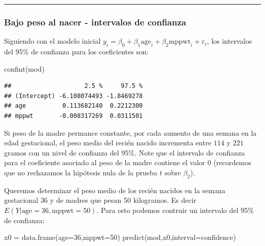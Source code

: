 \documentclass[
]{article}
\newenvironment{Shaded}{\begin{snugshade}}{\end{snugshade}}
\newcommand{\AttributeTok}[1]{\textcolor[rgb]{0.77,0.63,0.00}{#1}}
\newcommand{\DecValTok}[1]{\textcolor[rgb]{0.00,0.00,0.81}{#1}}
\newcommand{\FunctionTok}[1]{\textcolor[rgb]{0.00,0.00,0.00}{#1}}
\newcommand{\NormalTok}[1]{#1}
\newcommand{\OtherTok}[1]{\textcolor[rgb]{0.56,0.35,0.01}{#1}}
\newcommand{\StringTok}[1]{\textcolor[rgb]{0.31,0.60,0.02}{#1}}
\begin{document}
\rule{\textwidth}{0.4pt}

\hypertarget{bajo-peso-al-nacer---intervalos-de-confianza}{%
\subsubsection*{Bajo peso al nacer - intervalos de confianza}\label{bajo-peso-al-nacer---intervalos-de-confianza}}

Siguiendo con el modelo inicial \(y_{i}=\beta_{0}+\beta_{1}\mbox{age}_{i}+\beta_{2}\mbox{mppwt}_{i}+\varepsilon_{i}\), los intervalos del 95\% de confianza para los coeficientes son:

\begin{Shaded}
\begin{Highlighting}[]
\FunctionTok{confint}\NormalTok{(mod)}
\end{Highlighting}
\end{Shaded}

\begin{verbatim}
##                    2.5 %     97.5 %
## (Intercept) -6.108074493 -1.8469278
## age          0.113682140  0.2212300
## mppwt       -0.008317269  0.0311501
\end{verbatim}

Si peso de la madre permance constante, por cada aumento de una semana en la edad gestacional, el peso medio del recién nacido incrementa entre \(114\) y \(221\) gramos con un nivel de confianza del 95\%. Note que el intervalo de confianza para el coeficiente asociado al peso de la madre contiene el valor \(0\) (recordemos que no rechazamos la hipótesis nula de la prueba \(t\) sobre \(\beta_{2}\)).

Queremos determinar el peso medio de los recién nacidos en la semana gestacional \(36\) y de madres que pesan 50 kilogramos. Es decir \(E(Y|\mbox{age}=36, \mbox{mppwt}=50)\). Para esto podemos contruir un intervalo del 95\% de confianza:

\begin{Shaded}
\begin{Highlighting}[]
\NormalTok{x0 }\OtherTok{=} \FunctionTok{data.frame}\NormalTok{(}\AttributeTok{age=}\DecValTok{36}\NormalTok{,}\AttributeTok{mppwt=}\DecValTok{50}\NormalTok{)}
\FunctionTok{predict}\NormalTok{(mod,x0,}\AttributeTok{interval=}\StringTok{\textquotesingle{}confidence\textquotesingle{}}\NormalTok{)}
\end{Highlighting}
\end{Shaded}
\end{document}
